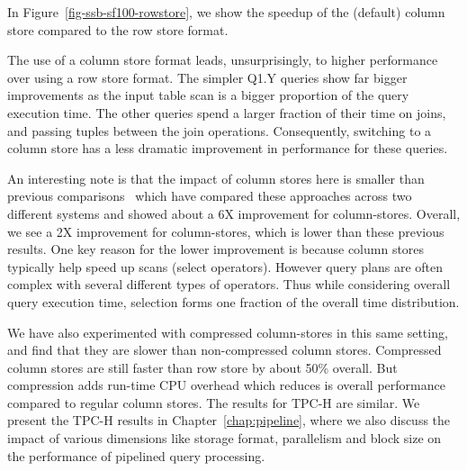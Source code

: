 In Figure~\ref{fig-ssb-sf100-rowstore}, we show the speedup of the (default) column store compared to the row store format.


The use of a column store format leads, unsurprisingly, to higher performance over using a row store format. %
The simpler Q1.Y queries show far bigger improvements as the input table scan is a bigger proportion of the query execution time. The other queries spend a larger fraction of their time on joins, and passing tuples between the join operations. Consequently, switching to a column store has a less dramatic improvement in performance for these queries.

An interesting note is that the impact of column stores here is  smaller than previous comparisons~\cite{AbadiMH08} which have compared these approaches across two different systems and showed about a 6X improvement for column-stores. Overall, we see a 2X improvement for column-stores, which is lower than these previous results.
One key reason for the lower improvement is because column stores typically help speed up scans (select operators).
However query plans are often complex with several different types of operators. 
Thus while considering overall query execution time, selection forms one fraction of the overall time distribution. 

We have also experimented with compressed column-stores in this same setting, and find that they are slower than non-compressed column stores. Compressed column stores are still faster than row store by about 50\% overall. But compression adds run-time CPU overhead which reduces is overall performance compared to regular column stores. 
The results for TPC-H are similar. 
We present the TPC-H results in Chapter~\ref{chap:pipeline}, where we also discuss the impact of various dimensions like storage format, parallelism and block size on the performance of pipelined query processing.



